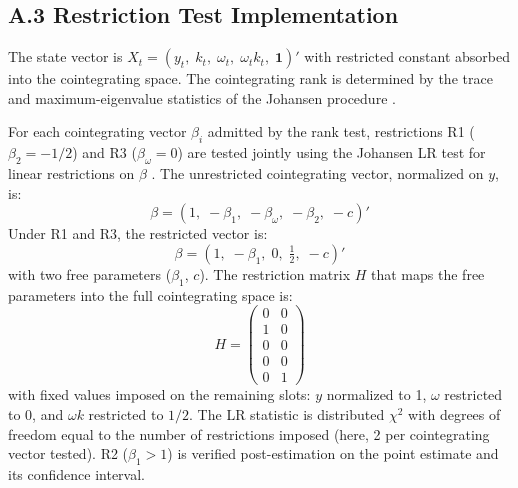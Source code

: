 \subsection*{A.3 Restriction Test Implementation}

The state vector is
$X_t = (y_t,\; k_t,\; \omega_t,\; \omega_t k_t,\; \mathbf{1})'$
with restricted constant absorbed into the cointegrating space.
The cointegrating rank is determined by the trace and
maximum-eigenvalue statistics of the Johansen procedure
\citep{Johansen1991}.

For each cointegrating vector $\beta_i$ admitted by the rank test,
restrictions R1 ($\beta_2 = -1/2$) and R3 ($\beta_\omega = 0$) are
tested jointly using the Johansen LR test for linear restrictions on
$\beta$ \citep{Johansen1991}. The unrestricted cointegrating vector,
normalized on $y$, is:
%
\begin{equation}
\beta = (1,\; -\beta_1,\; -\beta_\omega,\; -\beta_2,\; -c)'
\end{equation}
%
Under R1 and R3, the restricted vector is:
%
\begin{equation}
\beta = (1,\; -\beta_1,\; 0,\; \tfrac{1}{2},\; -c)'
\end{equation}
%
with two free parameters ($\beta_1$, $c$). The restriction matrix
$H$ that maps the free parameters into the full cointegrating space
is:
%
\begin{equation}
H = \begin{pmatrix}
0 & 0 \\
1 & 0 \\
0 & 0 \\
0 & 0 \\
0 & 1
\end{pmatrix}
\label{eq:H_matrix}
\end{equation}
%
with fixed values imposed on the remaining slots: $y$ normalized to
1, $\omega$ restricted to 0, and $\omega k$ restricted to $1/2$. The
LR statistic is distributed $\chi^2$ with degrees of freedom equal
to the number of restrictions imposed (here, 2 per cointegrating
vector tested). R2 ($\beta_1 > 1$) is verified post-estimation on
the point estimate and its confidence interval.
